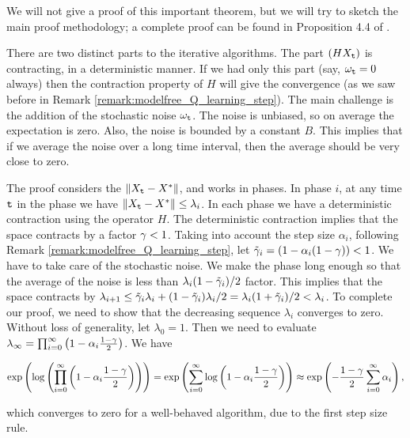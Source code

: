 We will not give a proof of this important theorem, but we will try
to sketch the main proof methodology; a complete proof can be found in Proposition 4.4 of \cite{Bertsekas05}.

There are two distinct parts to the iterative algorithms. The part
$(HX_{\tt t})$ is contracting, in a deterministic manner. If we had
only this part (say, $\omega_{\tt t}=0$ always) then the contraction
property of $H$ will give the convergence (as we saw before in Remark \ref{remark:modelfree_Q_learning_step}). The
main challenge is the addition of the stochastic noise $\omega_{\tt t}$. The
noise is unbiased, so on average the expectation is zero. Also, the
noise is bounded by a constant $B$. This implies that if we average
the noise over a long time interval, then the average should be very
close to zero.

The proof considers the $\|X_{\tt t}-X^*\|$, and  works in phases. In
phase $i$, at any time ${\tt t}$ in the phase we have
$\|X_{\tt t}-X^*\|\leq \lambda_i$.
%
In each phase we have a deterministic contraction using the operator
$H$. The deterministic contraction implies that
the space contracts by a factor $\gamma<1$. Taking into account the step size $\alpha_i$, following Remark \ref{remark:modelfree_Q_learning_step}, let $\tilde{\gamma}_i = \left( 1 - \alpha_i(1 - \gamma)\right)<1$. We have to take care
of the stochastic noise. We make the phase long enough so that the
average of the noise is less than $\lambda_i (1-\tilde{\gamma}_i)/2$ factor. This
implies that the space contracts by
$\lambda_{i+1}\leq\tilde{\gamma}_i\lambda_i+(1-\tilde{\gamma}_i)\lambda_i/2=\lambda_i(1+\tilde{\gamma}_i)/2<\lambda_i $. To complete our proof, we need to show that the decreasing sequence $\lambda_i$ converges to zero.
Without loss of generality, let $\lambda_0=1$. Then we need to evaluate $\lambda_\infty = \prod_{i=0}^{\infty}\left( 1 - \alpha_i\frac{1-\gamma}{2}\right)$. We have
\begin{small}
\begin{equation*}
    \exp\left( \log \left( \prod_{i=0}^{\infty}\left( 1 - \alpha_i\frac{1-\gamma}{2}\right) \right)\right) = \exp\left(   \sum_{i=0}^{\infty}\log\left( 1 - \alpha_i\frac{1-\gamma}{2}\right) \right)\approx \exp\left(   -\frac{1-\gamma}{2}\sum_{i=0}^{\infty}\alpha_i \right),
\end{equation*}
\end{small}
which converges to zero for a well-behaved algorithm, due to the first step size rule.


